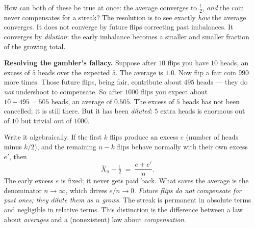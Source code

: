 How can both of these be true at once: the average converges to $\tfrac12$, \emph{and} the coin never compensates for a streak? The resolution is to see exactly \emph{how} the average converges. It does not converge by future flips correcting past imbalances. It converges by \emph{dilution}: the early imbalance becomes a smaller and smaller fraction of the growing total.

\begin{paradoxbox}
\textbf{Resolving the gambler's fallacy.} Suppose after $10$ flips you have $10$ heads, an excess of $5$ heads over the expected $5$. The average is $1.0$. Now flip a fair coin $990$ more times. Those future flips, being fair, contribute about $495$ heads --- they do \emph{not} undershoot to compensate. So after $1000$ flips you expect about $10 + 495 = 505$ heads, an average of $0.505$. The excess of $5$ heads has not been cancelled; it is still there. But it has been \emph{diluted}: $5$ extra heads is enormous out of $10$ but trivial out of $1000$.

Write it algebraically. If the first $k$ flips produce an excess $e$ (number of heads minus $k/2$), and the remaining $n-k$ flips behave normally with their own excess $e'$, then
\[
  \bar X_n - \tfrac12 \;=\; \frac{e + e'}{n}.
\]
The early excess $e$ is fixed; it never gets paid back. What saves the average is the denominator $n \to \infty$, which drives $e/n \to 0$. \emph{Future flips do not compensate for past ones; they dilute them as $n$ grows.} The streak is permanent in absolute terms and negligible in relative terms. This distinction is the difference between a law about \emph{averages} and a (nonexistent) law about \emph{compensation}.
\end{paradoxbox}

